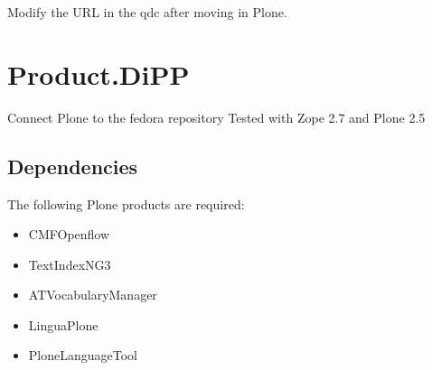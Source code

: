 \documentclass[a4paper,10pt,ngerman]{sphinxmanual}
\begin{document}

\begin{fulllineitems}
\label{modules:dipp.dipp3.qdc.setURL}
Modify the URL in the qdc after moving in Plone.

\end{fulllineitems}



\section{Product.DiPP}
\label{readme:product-dipp}\label{readme::doc}
Connect Plone to the fedora repository
Tested with Zope 2.7 and Plone 2.5


\subsection{Dependencies}
\label{readme:dependencies}
The following Plone products are required:
\begin{itemize}
\item {} 
CMFOpenflow

\item {} 
TextIndexNG3

\item {} 
ATVocabularyManager

\item {} 
LinguaPlone

\item {} 
PloneLanguageTool

\end{itemize}
\end{document}
